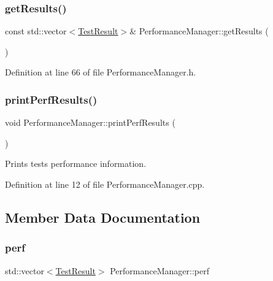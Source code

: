 \mbox{\label{class_performance_manager_aca3998b3ce95df432df3b72eda3f639e}} 
\subsubsection{\texorpdfstring{get\+Results()}{getResults()}}
{\footnotesize\ttfamily const std\+::vector$<$\hyperlink{class_test_result}{Test\+Result}$>$\& Performance\+Manager\+::get\+Results (\begin{DoxyParamCaption}{ }\end{DoxyParamCaption})\hspace{0.3cm}{\ttfamily [inline]}}



Definition at line 66 of file Performance\+Manager.\+h.

\mbox{\label{class_performance_manager_a51d37a97f0ef246c5e5e5b6c2bbefc23}} 
\subsubsection{\texorpdfstring{print\+Perf\+Results()}{printPerfResults()}}
{\footnotesize\ttfamily void Performance\+Manager\+::print\+Perf\+Results (\begin{DoxyParamCaption}{ }\end{DoxyParamCaption})}

Prints tests performance information. 

Definition at line 12 of file Performance\+Manager.\+cpp.



\subsection{Member Data Documentation}
\mbox{\label{class_performance_manager_ad71f956546a14c54a6a6122f0b857b9d}} 
\subsubsection{\texorpdfstring{perf}{perf}}
{\footnotesize\ttfamily std\+::vector$<$\hyperlink{class_test_result}{Test\+Result}$>$ Performance\+Manager\+::perf\hspace{0.3cm}{\ttfamily [protected]}}

